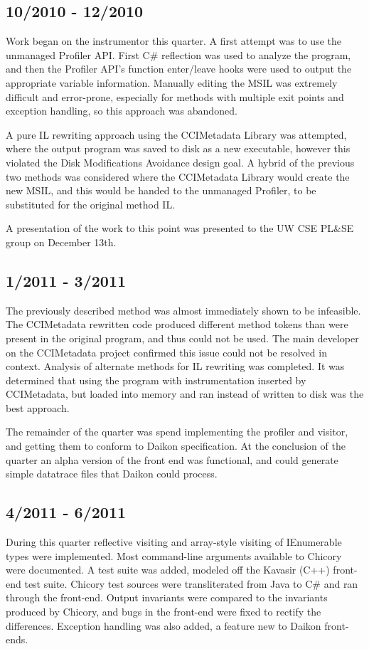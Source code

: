 \documentclass{article}
\begin{document}
\subsection{10/2010 - 12/2010}
Work began on the instrumentor this quarter. A first attempt was to use the unmanaged Profiler API. First C\# reflection was used to analyze the program, and then the Profiler API's function enter/leave hooks were used to output the appropriate variable information. Manually editing the MSIL was extremely difficult and error-prone, especially for methods with multiple exit points and exception handling, so this approach was abandoned.

A pure IL rewriting approach using the CCIMetadata Library was attempted, where the output program was saved to disk as a new executable, however this violated the Disk Modifications Avoidance design goal. A hybrid of the previous two methods was considered where the CCIMetadata Library would create the new MSIL, and this would be handed to the unmanaged Profiler, to be substituted for the original method IL.

A presentation of the work to this point was presented to the UW CSE PL\&SE group on December 13th.
\subsection{1/2011 - 3/2011}
The previously described method was almost immediately shown to be infeasible. The CCIMetadata rewritten code produced different method tokens than were present in the original program, and thus could not be used. The main developer on the CCIMetadata project confirmed this issue could not be resolved in context. Analysis of alternate methods for IL rewriting was completed. It was determined that using the program with instrumentation inserted by CCIMetadata, but loaded into memory and ran instead of written to disk was the best approach.

The remainder of the quarter was spend implementing the profiler and visitor, and getting them to conform to Daikon specification. At the conclusion of the quarter an alpha version of the front end was functional, and could generate simple datatrace files that Daikon could process.

\subsection{4/2011 - 6/2011}
During this quarter reflective visiting and array-style visiting of IEnumerable types were implemented. Most command-line arguments available to Chicory were documented. A test suite was added, modeled off the Kavasir (C++) front-end test suite. Chicory test sources were transliterated from Java to C\# and ran through the front-end. Output invariants were compared to the invariants produced by Chicory, and bugs in the front-end were fixed to rectify the differences. Exception handling was also added, a feature new to Daikon front-ends.
\end{document}
